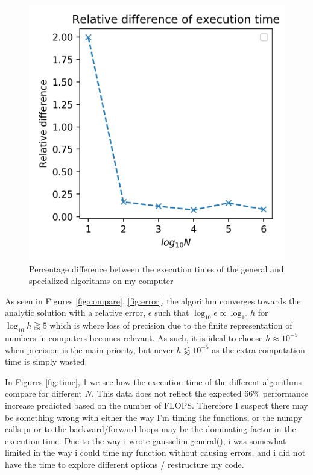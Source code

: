 \documentclass[10pt,showpacs,preprintnumbers,footinbib,amsmath,amssymb,aps,prl,twocolumn,groupedaddress,superscriptaddress,showkeys]{revtex4-1}
\begin{document}
  \begin{figure}[h!]
    \center
    \includegraphics[scale=.7]{figs/ex1d_timediff.png}
    \caption{Percentage difference between the execution times of the general and specialized algorithms on my computer}
    \label{fig:timediff}
  \end{figure}

  \newpage
  
  As seen in Figures \ref{fig:compare}, \ref{fig:error}, the algorithm converges towards the analytic solution with a relative error, $\epsilon$ such that $\log_{10}\epsilon \propto \log_{10} h$ for $\log_{10}h \gtrapprox 5$ which is where loss of precision due to the finite representation of numbers in computers becomes relevant. As such, it is ideal to choose $h\approx 10^{-5}$ when precision is the main priority, but never $h\lessapprox10^{-5}$ as the extra computation time is simply wasted.

  In Figures \ref{fig:time}, \ref{fig:timediff} we see how the execution time of the different algorithms compare for different $N$. This data does not reflect the expected $66\%$ performance increase predicted based on the number of FLOPS. Therefore I suspect there may be something wrong with either the way I'm timing the functions, or the numpy calls prior to the backward/forward loops may be the dominating factor in the execution time. Due to the way i wrote gausselim.general(), i was somewhat limited in the way i could time my function without causing errors, and i did not have the time to explore different options / restructure my code.
\end{document}
